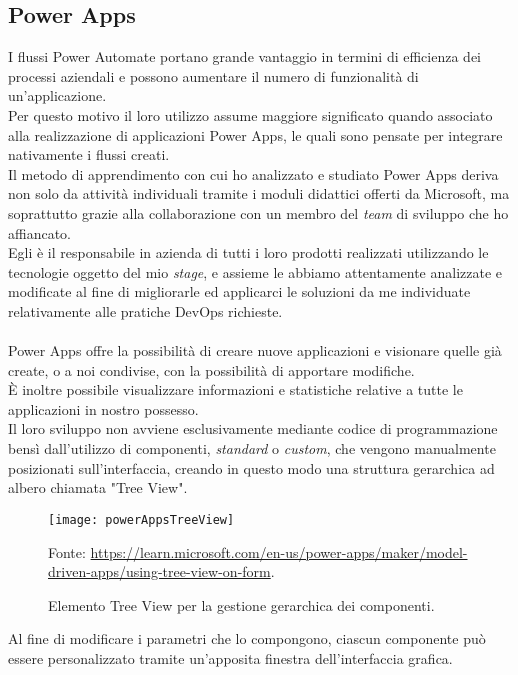 \subsection{Power Apps}
I flussi Power Automate portano grande vantaggio in termini di efficienza dei processi aziendali e possono aumentare il numero di funzionalità di un'applicazione.\\
Per questo motivo il loro utilizzo assume maggiore significato quando associato alla realizzazione di applicazioni Power Apps, le quali sono pensate per integrare nativamente i flussi creati.\\
Il metodo di apprendimento con cui ho analizzato e studiato Power Apps deriva non solo da attività individuali tramite i moduli didattici offerti da Microsoft, ma soprattutto grazie alla collaborazione con un membro del \emph{team} di sviluppo che ho affiancato.\\
Egli è il responsabile in azienda di tutti i loro prodotti realizzati utilizzando le tecnologie oggetto del mio \emph{stage}, e assieme le abbiamo attentamente analizzate e modificate al fine di migliorarle ed applicarci le soluzioni da me individuate relativamente alle pratiche \gls{DevOps} richieste.\\\\
Power Apps offre la possibilità di creare nuove applicazioni e visionare quelle già create, o a noi condivise, con la possibilità di apportare modifiche.\\
È inoltre possibile visualizzare informazioni e statistiche relative a tutte le applicazioni in nostro possesso.\\
Il loro sviluppo non avviene esclusivamente mediante codice di programmazione bensì dall'utilizzo di componenti, \emph{standard} o \emph{custom}, che vengono manualmente posizionati sull'interfaccia, creando in questo modo una struttura gerarchica ad albero chiamata "Tree View".
\begin{figure}[htbp] 
    \centering 
    \texttt{[image: powerAppsTreeView]} 
    \caption{Elemento Tree View per la gestione gerarchica dei componenti.}
    \label{fig:powerAppsTreeView}
    \vspace{1mm}
    Fonte: \url{https://learn.microsoft.com/en-us/power-apps/maker/model-driven-apps/using-tree-view-on-form}.
\end{figure}
\newline \noindent Al fine di modificare i parametri che lo compongono, ciascun componente può essere personalizzato tramite un'apposita finestra dell'interfaccia grafica.\\
